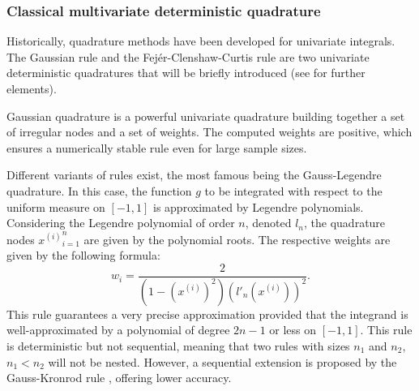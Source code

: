 \subsubsection{Classical multivariate deterministic quadrature}

Historically, quadrature methods have been developed for univariate integrals. 
The Gaussian rule and the Fejér-Clenshaw-Curtis rule are two univariate deterministic quadratures that will be briefly introduced (see \cite{sullivan_2015} for further elements). 

Gaussian quadrature is a powerful univariate quadrature building together a set of irregular nodes and a set of weights. 
The computed weights are positive, which ensures a numerically stable rule even for large sample sizes.

Different variants of rules exist, the most famous being the Gauss-Legendre quadrature. 
In this case, the function $g$ to be integrated with respect to the uniform measure on $[-1, 1]$ is approximated by Legendre polynomials.
Considering the Legendre polynomial of order $n$, denoted $l_n$, the quadrature nodes ${x^{(i)}}_{i=1}^n$ are given by the polynomial roots.
The respective weights are given by the following formula: 
\begin{equation}
    w_{i}={\frac {2}{\left(1-\left(x^{(i)}\right)^{2}\right)\left(l'_{n}(x^{(i)})\right)^{2}}}.
\end{equation}
This rule guarantees a very precise approximation provided that the integrand is well-approximated by a polynomial of degree $2n-1$ or less on $[-1, 1]$.
This rule is deterministic but not sequential, meaning that two rules with sizes $n_1$ and $n_2$, $n_1 < n_2$ will not be nested. 
However, a sequential extension is proposed by the Gauss-Kronrod rule \citep{laurie_1997}, offering lower accuracy. 

